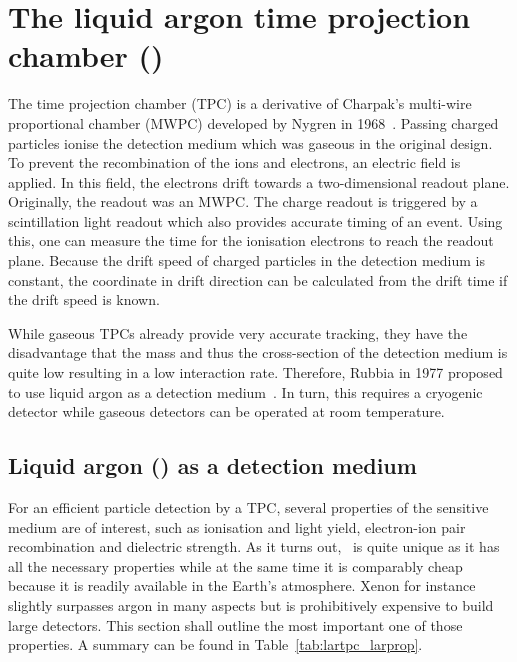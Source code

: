 \chapter{The liquid argon time projection chamber (\lartpc)\label{chap:lartpc}}

The time projection chamber (TPC) is a derivative of Charpak's multi-wire proportional chamber (MWPC)\cite{mwpc} developed by Nygren in 1968~\cite{sauce}.
Passing charged particles ionise the detection medium which was gaseous in the original design.
To prevent the recombination of the ions and electrons, an electric field is applied.
In this field, the electrons drift towards a two-dimensional readout plane.
Originally, the readout was an MWPC.
The charge readout is triggered by a scintillation light readout which also provides accurate timing of an event.
Using this, one can measure the time for the ionisation electrons to reach the readout plane.
Because the drift speed of charged particles in the detection medium is constant, the coordinate in drift direction can be calculated from the drift time if the drift speed is known.

While gaseous TPCs already provide very accurate tracking, they have the disadvantage that the mass and thus the cross-section of the detection medium is quite low resulting in a low interaction rate.
Therefore, Rubbia in 1977 proposed to use liquid argon as a detection medium~\cite{lartpc}.
In turn, this requires a cryogenic detector while gaseous detectors can be operated at room temperature.


\section{Liquid argon (\lar) as a detection medium\label{sec:lartpc_lar}}

For an efficient particle detection by a TPC, several properties of the sensitive medium are of interest, such as ionisation and light yield, electron-ion pair recombination and dielectric strength.
As it turns out, \lar\ is quite unique as it has all the necessary properties while at the same time it is comparably cheap because it is readily available in the Earth's atmosphere.
Xenon for instance slightly surpasses argon in many aspects but is prohibitively expensive to build large detectors.
This section shall outline the most important one of those properties.
A summary can be found in Table~\ref{tab:lartpc_larprop}.


